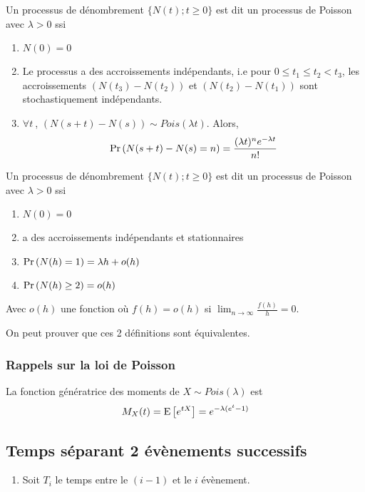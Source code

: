 \documentclass[10pt, french]{article}
\begin{document}
\begin{multicols*}{2}
\begin{definition}[Définition 1]
Un processus de dénombrement $\{N(t) ; t \geq 0 \}$ est dit un processus de Poisson avec $\lambda >0$ ssi
\begin{enumerate}[label=(\arabic*)]
\item $N(0)=0$
\item Le processus a des accroissements indépendants, i.e pour $0 \leq t_1 \leq t_2 < t_3$, les accroissements $(N(t_3) - N(t_2))$ et $(N(t_2)-N(t_1))$ sont stochastiquement indépendants.
\item $\forall t \ $, $(N(s+t) - N(s)) \sim Pois(\lambda t)$. Alors,
\begin{align*}
\Pr \left( N(s+t) - N(s) = n \right) = \frac{(\lambda t)^n e^{-\lambda t}}{n!}
\end{align*}
\end{enumerate}
\end{definition}

\begin{definition}[Définition 2]
Un processus de dénombrement $\{N(t) ; t \geq 0 \}$ est dit un processus de Poisson avec $\lambda>0$ ssi
\begin{enumerate}[label=(\arabic*)]
\item $N(0)=0$
\item a des accroissements indépendants et stationnaires
\item $\Pr \left( N(h) = 1 \right) = \lambda h + o(h)$
\item $\Pr \left( N(h) \geq 2 \right) = o(h)$
\end{enumerate}
Avec $o(h)$ une fonction où $f(h) = o(h)$ si $\lim_{n \to \infty} \frac{f(h)}{h} = 0$.
\end{definition}
On peut prouver que ces 2 définitions sont équivalentes.

\subsubsection*{Rappels sur la loi de Poisson}
La fonction génératrice des moments de $X \sim Pois(\lambda)$ est
\[ M_X(t) = \mathrm{E} \left[ e^{tX} \right]  = e^{-\lambda(e^{t} -1)} \]


\subsection*{Temps séparant 2 évènements successifs}\begin{enumerate}[label=\faAngleRight]
\item Soit $T_i$ le temps entre le $(i-1)$ et le $i$ évènement.


\end{enumerate}
\end{multicols*}
\end{document}
